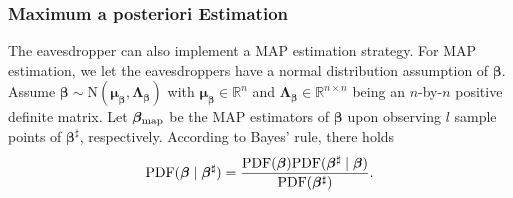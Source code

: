 \documentclass[a4paper, 11pt]{article}
\newcommand{\R}{\mathbb{R}}
\newcommand{\1}{\mathbf{1}}
\DeclareMathOperator*{\argmax}{argmax}
\newcommand{\Ind}{\mathcal{I}}
\newcommand{\asf}{\mathcal{E}}
\newcommand{\vb}{\mathbf{v}}
\newcommand{\xb}{\mathbf{x}}
\newcommand{\normdist}{\mathrm{N}}
\newcommand{\Head}{\textnormal{Head}}
\newcommand{\Tail}{\textnormal{Tail}}
\newcommand{\betab}{\bm{\beta}}
\newcommand{\mub}{\bm{\mu}}
\newcommand{\Lambdab}{\bm{\Lambda}}
\newcommand{\betamapfs}{{\betab}_{\textnormal{map}}}
\begin{document}
{	\subsubsection{Maximum a posteriori Estimation}
	The eavesdropper can also implement a MAP estimation strategy. For MAP estimation, we let the eavesdroppers have a normal distribution assumption of $\betab$. Assume $\betab\sim\normdist(\mub_{\betab},\Lambdab_{\betab})$ with $\mub_{\betab}\in\R^n$ and $\Lambdab_{\betab}\in\R^{n\times n}$ being an $n$-by-$n$ positive definite matrix. Let $\betamapfs$ be the MAP estimators of $\betab$ upon observing $l$ sample points of $\betab^\sharp$, respectively.
	According to Bayes' rule, there holds
	\begin{equation}\label{eq:bayes_rule}
	{\rm PDF}(\betab\mid\betab^\sharp)=\frac{{\rm PDF}(\betab){\rm PDF}(\betab^\sharp\mid\betab)}{{\rm PDF}(\betab^\sharp)}.
	\end{equation}
}
\end{document}
